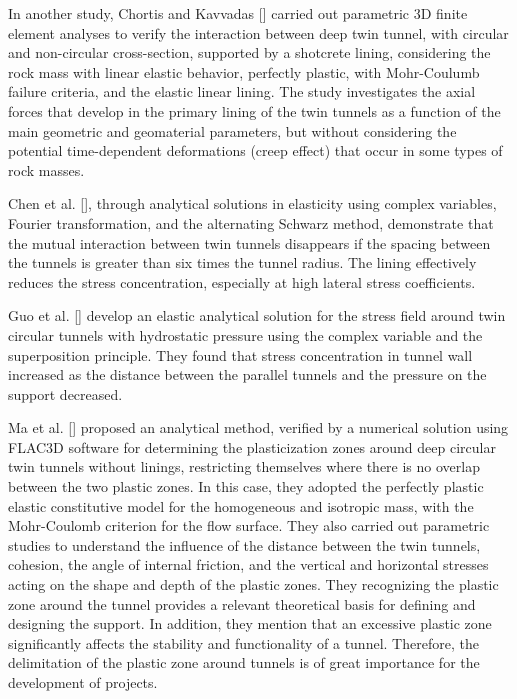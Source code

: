 \documentclass[a4paper,fleqn]{cas-sc}
\begin{document}
In another study, Chortis and Kavvadas [] carried out parametric 3D finite element analyses to verify the interaction between deep twin tunnel, with circular and non-circular cross-section, supported by a shotcrete lining, considering the rock mass with linear elastic behavior, perfectly plastic, with Mohr-Coulumb failure criteria, and the elastic linear lining. The study investigates the axial forces that develop in the primary lining of the twin tunnels as a function of the main geometric and geomaterial parameters, but without considering the potential time-dependent deformations (creep effect) that occur in some types of rock masses.

Chen et al. [], through analytical solutions in elasticity using complex variables, Fourier transformation, and the alternating Schwarz method, demonstrate that the mutual interaction between twin tunnels disappears if the spacing between the tunnels is greater than six times the tunnel radius. The lining effectively reduces the stress concentration, especially at high lateral stress coefficients.

Guo et al. [] develop an elastic analytical solution for the stress field around twin circular tunnels with hydrostatic pressure using the complex variable and the superposition principle. They found that stress concentration in tunnel wall increased as the distance between the parallel tunnels and the pressure on the support decreased.

Ma et al. [] proposed an analytical method, verified by a numerical solution using FLAC3D software for determining the plasticization zones around deep circular twin tunnels without linings, restricting themselves where there is no overlap between the two plastic zones. In this case, they adopted the perfectly plastic elastic constitutive model for the homogeneous and isotropic mass, with the Mohr-Coulomb criterion for the flow surface. They also carried out parametric studies to understand the influence of the distance between the twin tunnels, cohesion, the angle of internal friction, and the vertical and horizontal stresses acting on the shape and depth of the plastic zones. They recognizing the plastic zone around the tunnel provides a relevant theoretical basis for defining and designing the support. In addition, they mention that an excessive plastic zone significantly affects the stability and functionality of a tunnel. Therefore, the delimitation of the plastic zone around tunnels is of great importance for the development of projects.
\end{document}
